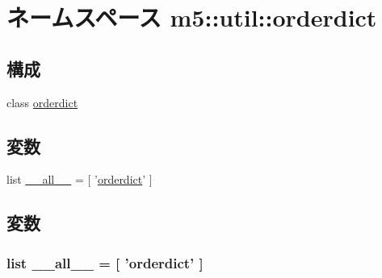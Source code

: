 \hypertarget{namespacem5_1_1util_1_1orderdict}{
\section{ネームスペース m5::util::orderdict}
\label{namespacem5_1_1util_1_1orderdict}
}
\subsection*{構成}
\begin{DoxyCompactItemize}
\item 
class \hyperlink{classm5_1_1util_1_1orderdict_1_1orderdict}{orderdict}
\end{DoxyCompactItemize}
\subsection*{変数}
\begin{DoxyCompactItemize}
\item 
list \hyperlink{namespacem5_1_1util_1_1orderdict_aa4a022e6ddacd362b83964da5cc5d044}{\_\-\_\-all\_\-\_\-} = \mbox{[} '\hyperlink{classm5_1_1util_1_1orderdict_1_1orderdict}{orderdict}' \mbox{]}
\end{DoxyCompactItemize}


\subsection{変数}
\hypertarget{namespacem5_1_1util_1_1orderdict_aa4a022e6ddacd362b83964da5cc5d044}{
\subsubsection[{\_\-\_\-all\_\-\_\-}]{\setlength{\rightskip}{0pt plus 5cm}list {\bf \_\-\_\-all\_\-\_\-} = \mbox{[} '{\bf orderdict}' \mbox{]}}}
\label{namespacem5_1_1util_1_1orderdict_aa4a022e6ddacd362b83964da5cc5d044}
